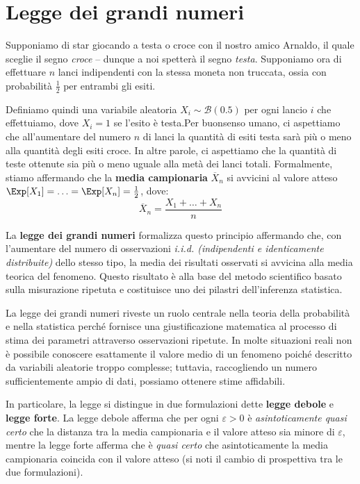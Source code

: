 \documentclass[a4paper, 12pt]{report}
\begin{document}
    \section{Legge dei grandi numeri}

    Supponiamo di star giocando a testa o croce con il nostro amico Arnaldo, il quale sceglie il segno \textit{croce} -- dunque a noi spetterà il segno \textit{testa}. Supponiamo ora di effettuare $n$ lanci indipendenti con la stessa moneta non truccata, ossia con probabilità $\frac{1}{2}$ per entrambi gli esiti.
    
    Definiamo quindi una variabile aleatoria $X_i \sim \mathcal{B}(0.5)$ per ogni lancio $i$ che effettuiamo, dove $X_i = 1$ se l'esito è testa.Per buonsenso umano, ci aspettiamo che all'aumentare del numero $n$ di lanci la quantità di esiti testa sarà più o meno alla quantità degli esiti croce. In altre parole, ci aspettiamo che la quantità di teste ottenute sia più o meno uguale alla metà dei lanci totali. Formalmente, stiamo affermando che la \textbf{media campionaria} $\overline{X}_n$ si avvicini al valore atteso $\Exp[X_1] = \ldots = \Exp[X_n] = \frac{1}{2}$, dove:
    \[\overline{X}_n = \frac{X_1 + \ldots + X_n}{n}\]

    La \textbf{legge dei grandi numeri} formalizza questo principio affermando che, con l'aumentare del numero di osservazioni \textit{i.i.d. (indipendenti e identicamente distribuite)} dello stesso tipo, la media dei risultati osservati si avvicina alla media teorica del fenomeno. Questo risultato è alla base del metodo scientifico basato sulla misurazione ripetuta e costituisce uno dei pilastri dell'inferenza statistica.
    
    La legge dei grandi numeri riveste un ruolo centrale nella teoria della probabilità e nella statistica perché fornisce una giustificazione matematica al processo di stima dei parametri attraverso osservazioni ripetute. In molte situazioni reali non è possibile conoscere esattamente il valore medio di un fenomeno poiché descritto da variabili aleatorie troppo complesse; tuttavia, raccogliendo un numero sufficientemente ampio di dati, possiamo ottenere stime affidabili.
    
    In particolare, la legge si distingue in due formulazioni dette \textbf{legge debole} e \textbf{legge forte}. La legge debole afferma che per ogni $\varepsilon > 0$ è \textit{asintoticamente quasi certo} che la distanza tra la media campionaria e il valore atteso sia minore di $\varepsilon$, mentre la legge forte afferma che è \textit{quasi certo} che asintoticamente la media campionaria coincida con il valore atteso (si noti il cambio di prospettiva tra le due formulazioni).
\end{document}
